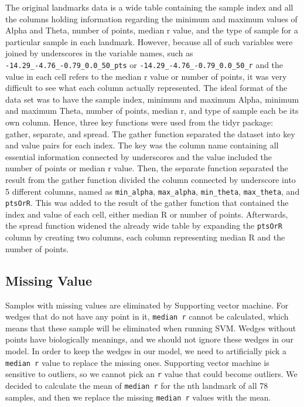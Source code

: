 \documentclass[10pt,letterpaper]{article}
\begin{document}
The original landmarks data is a wide table containing the sample index
and all the columns holding information regarding the minimum and
maximum values of Alpha and Theta, number of points, median r value, and
the type of sample for a particular sample in each landmark. However,
because all of such variables were joined by underscores in the variable
names, such as \texttt{-14.29\_-4.76\_-0.79\_0.0\_50\_pts} or
\texttt{-14.29\_-4.76\_-0.79\_0.0\_50\_r} and the value in each cell
refers to the median r value or number of points, it was very difficult
to see what each column actually represented. The ideal format of the
data set was to have the sample index, minimum and maximum Alpha,
minimum and maximum Theta, number of points, median r, and type of
sample each be its own column. Hence, three key functions were used from
the tidyr package: gather, separate, and spread. The gather function
separated the dataset into key and value pairs for each index. The key
was the column name containing all essential information connected by
underscores and the value included the number of points or median r
value. Then, the separate function separated the result from the gather
function divided the column connected by underscore into 5 different
columns, named as \texttt{min\_alpha}, \texttt{max\_alpha},
\texttt{min\_theta}, \texttt{max\_theta}, and \texttt{ptsOrR}. This was
added to the result of the gather function that contained the index and
value of each cell, either median R or number of points. Afterwards, the
spread function widened the already wide table by expanding the
\texttt{ptsOrR} column by creating two columns, each column representing
median R and the number of points.

\subsection{Missing Value}\label{missing-value}

Samples with missing values are eliminated by Supporting vector machine.
For wedges that do not have any point in it, \texttt{median\ r} cannot
be calculated, which means that these sample will be eliminated when
running SVM. Wedges without points have biologically meanings, and we
should not ignore these wedges in our model. In order to keep the wedges
in our model, we need to artificially pick a \texttt{median\ r} value to
replace the missing ones. Supporting vector machine is sensitive to
outliers, so we cannot pick an \texttt{r} value that could become
outliers. We decided to calculate the mean of \texttt{median\ r} for the
nth landmark of all 78 samples, and then we replace the missing
\texttt{median\ r} values with the mean.
\end{document}

